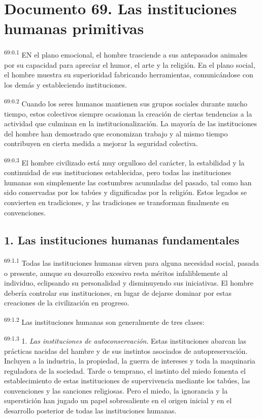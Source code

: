 \chapter{Documento 69. Las instituciones humanas primitivas}
\par
\textsuperscript{69:0.1} EN el plano emocional, el hombre trasciende a sus antepasados animales por su capacidad para apreciar el humor, el arte y la religión. En el plano social, el hombre muestra su superioridad fabricando herramientas, comunicándose con los demás y estableciendo instituciones.

\par
\textsuperscript{69:0.2} Cuando los seres humanos mantienen sus grupos sociales durante mucho tiempo, estos colectivos siempre ocasionan la creación de ciertas tendencias a la actividad que culminan en la institucionalización. La mayoría de las instituciones del hombre han demostrado que economizan trabajo y al mismo tiempo contribuyen en cierta medida a mejorar la seguridad colectiva.

\par
\textsuperscript{69:0.3} El hombre civilizado está muy orgulloso del carácter, la estabilidad y la continuidad de sus instituciones establecidas, pero todas las instituciones humanas son simplemente las costumbres acumuladas del pasado, tal como han sido conservadas por los tabúes y dignificadas por la religión. Estos legados se convierten en tradiciones, y las tradiciones se transforman finalmente en convenciones.

\section*{1. Las instituciones humanas fundamentales}
\par
\textsuperscript{69:1.1} Todas las instituciones humanas sirven para alguna necesidad social, pasada o presente, aunque su desarrollo excesivo resta méritos infaliblemente al individuo, eclipsando su personalidad y disminuyendo sus iniciativas. El hombre debería controlar sus instituciones, en lugar de dejarse dominar por estas creaciones de la civilización en progreso.

\par
\textsuperscript{69:1.2} Las instituciones humanas son generalmente de tres clases:

\par
\textsuperscript{69:1.3} 1. \textit{Las instituciones de autoconservación}. Estas instituciones abarcan las prácticas nacidas del hambre y de sus instintos asociados de autopreservación. Incluyen a la industria, la propiedad, la guerra de intereses y toda la maquinaria reguladora de la sociedad. Tarde o temprano, el instinto del miedo fomenta el establecimiento de estas instituciones de supervivencia mediante los tabúes, las convenciones y las sanciones religiosas. Pero el miedo, la ignorancia y la superstición han jugado un papel sobresaliente en el origen inicial y en el desarrollo posterior de todas las instituciones humanas.


